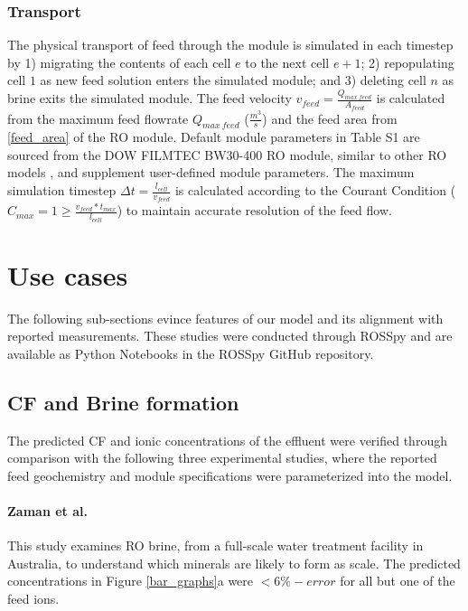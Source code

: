 \subsubsection{Transport}
The physical transport of feed through the module is simulated in each timestep by 1) migrating the contents of each cell $e$ to the next cell $e+1$; 2) repopulating cell $1$ as new feed solution enters the simulated module; and 3) deleting cell $n$ as brine exits the simulated module. The feed velocity $v_{feed}=\frac{Q_{max~feed}}{A_{feed}}$ is calculated from the maximum feed flowrate $Q_{max~feed}$ ($\frac{m^3}{s}$) and the feed area from \cref{feed_area} of the RO module. Default module parameters in Table S1 are sourced from the DOW FILMTEC BW30-400 RO module, similar to other RO models \cite{Li2012OptimalDesalination}, and supplement user-defined module parameters. The maximum simulation timestep $\Delta t=\frac{l_{cell}}{v_{feed}}$ is calculated according to the Courant Condition \cite{Gnedin2018EnforcingSchemes} ($C_{max}=1 \ge \frac{v_{feed}*t_{max}}{l_{cell}}$) to maintain accurate resolution of the feed flow.

\section{Use cases}
The following sub-sections evince features of our model and its alignment with reported measurements. These studies were conducted through ROSSpy and are available as Python Notebooks in the ROSSpy GitHub repository.

\subsection{CF and Brine formation}
The predicted CF and ionic concentrations of the effluent were verified through comparison with the following three experimental studies, where the reported feed geochemistry and module specifications were parameterized into the model. 

\paragraph{Zaman et al.\cite{Zaman2015DownstreamCompounds}}
This study examines RO brine, from a full-scale water treatment facility in Australia, to understand which minerals are likely to form as scale. The predicted concentrations in Figure \ref{bar_graphs}a were $<6\%-error$ for all but one of the feed ions.

